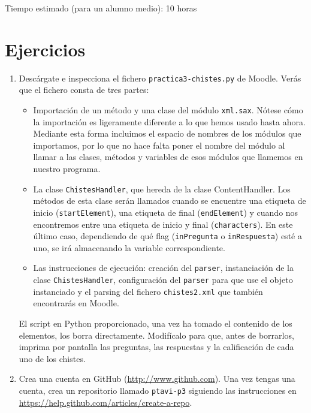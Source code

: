 \documentclass[11pt,a4paper]{article}
\newcommand{\finejercicio}{
  \begin{footnotesize}
    [Al terminar el ejercicio es recomendable hacer \texttt{commit} de los ficheros modificados]
  \end{footnotesize}
}
\begin{document}
Tiempo estimado (para un alumno medio): 10 horas

\section{Ejercicios}

\begin{enumerate}

  \item Descárgate e inspecciona el fichero \texttt{practica3-chistes.py} de Moodle. Verás que el fichero consta de tres partes:
  \begin{itemize}
    \item Importación de un método y una clase del módulo \texttt{xml.sax}. Nótese cómo la importación es ligeramente diferente a lo que hemos usado hasta ahora. Mediante esta forma incluimos el espacio de nombres de los módulos que importamos, por lo que no hace falta poner el nombre del módulo al llamar a las clases, métodos y variables de esos módulos que llamemos en nuestro programa.
    \item La clase \texttt{ChistesHandler}, que hereda de la clase ContentHandler. Los métodos de esta clase serán llamados cuando se encuentre una etiqueta de inicio (\texttt{startElement}), una etiqueta de final (\texttt{endElement}) y cuando nos encontremos entre una etiqueta de inicio y final (\texttt{characters}). En este último caso, dependiendo de qué flag (\texttt{inPregunta} o \texttt{inRespuesta}) esté a uno, se irá almacenando la variable correspondiente.
    \item Las instrucciones de ejecución: creación del \texttt{parser}, instanciación de la clase \texttt{ChistesHandler}, configuración del \texttt{parser} para que use el objeto instanciado y el parsing del fichero \texttt{chistes2.xml} que también encontrarás en Moodle.
  \end{itemize}

El script en Python proporcionado, una vez ha tomado el contenido de los elementos, los borra directamente. Modifícalo para que, antes de borrarlos, imprima por pantalla las preguntas, las respuestas y la calificación de cada uno de los chistes.



  \item Crea una cuenta en GitHub (\url{http://www.github.com}). Una vez tengas una cuenta, crea un repositorio llamado \texttt{ptavi-p3} siguiendo las instrucciones en \url{https://help.github.com/articles/create-a-repo}.


\end{enumerate}
\end{document}
